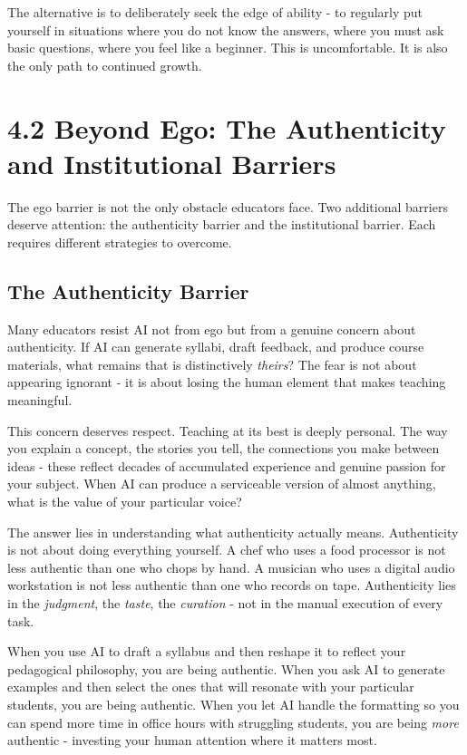 \documentclass[
  letterpaper,
  DIV=11,
  numbers=noendperiod]{scrreprt}
\begin{document}
The alternative is to deliberately seek the edge of ability - to
regularly put yourself in situations where you do not know the answers,
where you must ask basic questions, where you feel like a beginner. This
is uncomfortable. It is also the only path to continued growth.

\section{4.2 Beyond Ego: The Authenticity and Institutional
Barriers}\label{beyond-ego-the-authenticity-and-institutional-barriers}

The ego barrier is not the only obstacle educators face. Two additional
barriers deserve attention: the authenticity barrier and the
institutional barrier. Each requires different strategies to overcome.

\subsection{The Authenticity Barrier}\label{the-authenticity-barrier}

Many educators resist AI not from ego but from a genuine concern about
authenticity. If AI can generate syllabi, draft feedback, and produce
course materials, what remains that is distinctively \emph{theirs}? The
fear is not about appearing ignorant - it is about losing the human
element that makes teaching meaningful.

This concern deserves respect. Teaching at its best is deeply personal.
The way you explain a concept, the stories you tell, the connections you
make between ideas - these reflect decades of accumulated experience and
genuine passion for your subject. When AI can produce a serviceable
version of almost anything, what is the value of your particular voice?

The answer lies in understanding what authenticity actually means.
Authenticity is not about doing everything yourself. A chef who uses a
food processor is not less authentic than one who chops by hand. A
musician who uses a digital audio workstation is not less authentic than
one who records on tape. Authenticity lies in the \emph{judgment}, the
\emph{taste}, the \emph{curation} - not in the manual execution of every
task.

When you use AI to draft a syllabus and then reshape it to reflect your
pedagogical philosophy, you are being authentic. When you ask AI to
generate examples and then select the ones that will resonate with your
particular students, you are being authentic. When you let AI handle the
formatting so you can spend more time in office hours with struggling
students, you are being \emph{more} authentic - investing your human
attention where it matters most.
\end{document}
